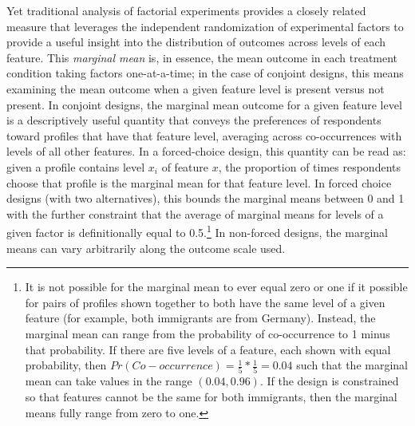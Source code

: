 \documentclass[a4paper,12pt]{article}\usepackage[]{graphicx}\usepackage[]{color}
\begin{document}
Yet traditional analysis of factorial experiments provides a closely related measure that leverages the independent randomization of experimental factors to provide a useful insight into the distribution of outcomes across levels of each feature. This \textit{marginal mean} is, in essence, the mean outcome in each treatment condition taking factors one-at-a-time; in the case of conjoint designs, this means examining the mean outcome when a given feature level is present versus not present. In conjoint designs, the marginal mean outcome for a given feature level is a descriptively useful quantity that conveys the preferences of respondents toward profiles that have that feature level, averaging across co-occurrences with levels of all other features. In a forced-choice design, this quantity can be read as: given a profile contains level $x_i$ of feature $x$, the proportion of times respondents choose that profile is the marginal mean for that feature level. In forced choice designs (with two alternatives), this bounds the marginal means between 0 and 1 with the further constraint that the average of marginal means for levels of a given factor is definitionally equal to 0.5.\footnote{It is not possible for the marginal mean to ever equal zero or one if it possible for pairs of profiles shown together to both have the same level of a given feature (for example, both immigrants are from Germany). Instead, the marginal mean can range from the probability of co-occurrence to 1 minus that probability. If there are five levels of a feature, each shown with equal probability, then $Pr(Co-occurrence) = \frac{1}{5}*\frac{1}{5} = 0.04$ such that the marginal mean can take values in the range $(0.04,0.96)$. If the design is constrained so that features cannot be the same for both immigrants, then the marginal means fully range from zero to one.} In non-forced designs, the marginal means can vary arbitrarily along the outcome scale used.
\end{document}
